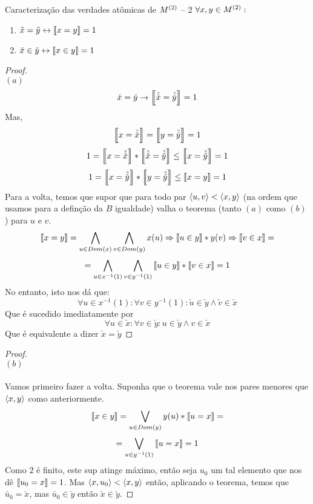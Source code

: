     \begin{theorem}{Caracterização das verdades atômicas de $M^{(2)}$ -- 2}
        $\forall x,y \in M^{(2)}:$
        \begin{enumerate}[label=(\alph*)]
            \item $\check{x}  = \check{y} \leftrightarrow \left\llbracket x = y\right\rrbracket = 1$
            \item $\check{x}\in \check{y} \leftrightarrow \left\llbracket x \in y\right\rrbracket = 1$
        \end{enumerate}
        \begin{proof}
            $ $\\$(a)$
            $$\check{x}=\check{y} \rightarrow \left\llbracket\hat{\check{x}} = \hat{\check{y}}\right\rrbracket = 1$$
            Mas,
            $$\left\llbracket x = \hat{\check{x}}\right\rrbracket = \left\llbracket y = \hat{\check{y}}\right\rrbracket = 1$$
            $$1 = \left\llbracket x = \hat{\check{x}}\right\rrbracket*\left\llbracket\hat{\check{x}} = \hat{\check{y}}\right\rrbracket \leq \left\llbracket x = \hat{\check{y}}\right\rrbracket = 1$$
            $$1 = \left\llbracket x = \hat{\check{y}}\right\rrbracket*\left\llbracket y = \hat{\check{y}}\right\rrbracket \leq \left\llbracket x = y\right\rrbracket = 1$$
            Para a volta, temos que supor que para todo par $\TUPLE{u}{v}<\TUPLE{x}{y}$ (na ordem que usamos para a 
            definção da $B$ igualdade) valha o teorema (tanto $(a)$ como $(b)$) para $u$ e $v$.
            $$\left\llbracket x = y\right\rrbracket = \bigwedge_{u\in Dom(x)}\bigwedge_{v\in Dom(y)} x(u)\Rightarrow\left\llbracket u \in y\right\rrbracket * y(v)\Rightarrow\left\llbracket v \in x\right\rrbracket = $$
            $$ = \bigwedge_{u\in x^{-1}(1)}\bigwedge_{v\in y^{-1}(1)} \left\llbracket u \in y\right\rrbracket * \left\llbracket v \in x\right\rrbracket = 1$$
            No entanto, isto nos dá que:
            $$\forall u\in x^{-1}(1): \forall v \in y^{-1}(1): \check{u}\in\check{y}\land\check{v}\in\check{x}$$
            Que é sucedido imediatamente por
            $$\forall u\in \check x: \forall v \in \check y: u\in\check{y}\land v\in\check{x}$$
            Que é equivalente a dizer $\check x = \check y$\eop
        \end{proof}
        \begin{proof}
            $ $\\$(b)$\\
            \paragraph{}
                Vamos primeiro fazer a volta. Suponha que o teorema vale nos pares menores que $\TUPLE{x}{y}$ como anteriormente.
                $$\left\llbracket x \in y\right\rrbracket = \bigvee_{u\in Dom(y)}y(u)*\left\llbracket u = x\right\rrbracket = $$
                $$ = \bigvee_{u\in y^{-1}(1)}\left\llbracket u = x\right\rrbracket = 1$$
                Como $2$ é finito, este sup atinge máximo, então seja $u_0$ um tal elemento que nos dê $\left\llbracket u_0 = x\right\rrbracket = 1$. Mas 
                $\TUPLE{x}{u_0}<\TUPLE{x}{y}$ então, aplicando o teorema, temos que $\check{u_0} = \check x$, mas 
                $\check {u_0} \in \check y$ então $\check x \in \check y$.

\end{proof}
\end{theorem}
